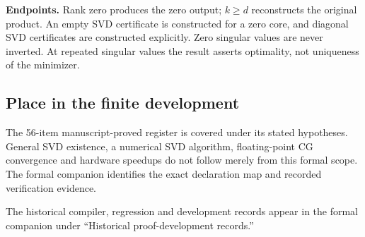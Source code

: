 \textbf{Endpoints.} Rank zero produces the zero output; $k\geq d$ reconstructs the original product. An empty SVD certificate is constructed for a zero core, and diagonal SVD certificates are constructed explicitly. Zero singular values are never inverted. At repeated singular values the result asserts optimality, not uniqueness of the minimizer.



\subsection{Place in the finite development}\label{supp6:subsection:006}
The 56-item manuscript-proved register is covered under its stated hypotheses. General SVD existence, a numerical SVD algorithm, floating-point CG convergence and hardware speedups do not follow merely from this formal scope. The formal companion identifies the exact declaration map and recorded verification evidence.

The historical compiler, regression and development records appear in the formal companion under ``Historical proof-development records.''
